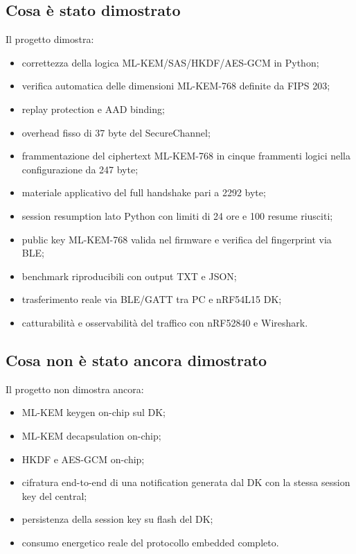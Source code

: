 \documentclass[11pt,a4paper]{article}
\providecommand{\tightlist}{\setlength{\itemsep}{0pt}\setlength{\parskip}{0pt}}
\begin{document}
\subsection{Cosa è stato
dimostrato}\label{cosa-uxe8-stato-dimostrato}

Il progetto dimostra:

\begin{itemize}
    \item correttezza della logica ML-KEM/SAS/HKDF/AES-GCM in Python;
    \item verifica automatica delle dimensioni ML-KEM-768 definite da FIPS 203;
    \item replay protection e AAD binding;
    \item overhead fisso di 37 byte del SecureChannel;
    \item frammentazione del ciphertext ML-KEM-768 in cinque frammenti logici nella configurazione da 247 byte;
    \item materiale applicativo del full handshake pari a 2292 byte;
    \item session resumption lato Python con limiti di 24 ore e 100 resume riusciti;
    \item public key ML-KEM-768 valida nel firmware e verifica del fingerprint via BLE;
    \item benchmark riproducibili con output TXT e JSON;
    \item trasferimento reale via BLE/GATT tra PC e nRF54L15 DK;
    \item catturabilità e osservabilità del traffico con nRF52840 e Wireshark.
\end{itemize}

\subsection{Cosa non è stato ancora
dimostrato}\label{cosa-non-uxe8-stato-ancora-dimostrato}

Il progetto non dimostra ancora:

\begin{itemize}
\tightlist
\item
  ML-KEM keygen on-chip sul DK;
\item
  ML-KEM decapsulation on-chip;
\item
  HKDF e AES-GCM on-chip;
\item
  cifratura end-to-end di una notification generata dal DK con la stessa
  session key del central;
\item
  persistenza della session key su flash del DK;
\item
  consumo energetico reale del protocollo embedded completo.
\end{itemize}
\end{document}
